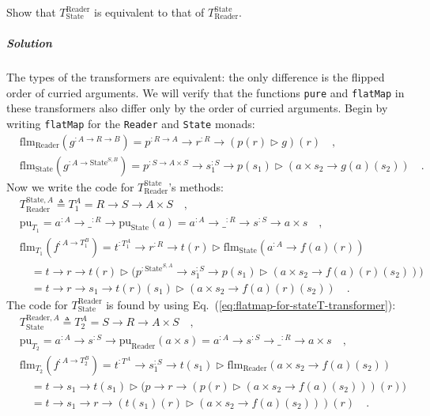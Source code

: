Show that $T_{\text{State}}^{\text{Reader}}$ is equivalent to that
of $T_{\text{Reader}}^{\text{State}}$.

\subparagraph{Solution}

The types of the transformers are equivalent: the only difference
is the flipped order of curried arguments. We will verify that the
functions \lstinline!pure! and \lstinline!flatMap! in these transformers
also differ only by the order of curried arguments. Begin by writing
\lstinline!flatMap! for the \lstinline!Reader! and \lstinline!State!
monads:
\begin{align*}
 & \text{flm}_{\text{Reader}}(g^{:A\rightarrow R\rightarrow B})=p^{:R\rightarrow A}\rightarrow r^{:R}\rightarrow(p(r)\triangleright g)(r)\quad,\\
 & \text{flm}_{\text{State}}(g^{:A\rightarrow\text{State}^{S,B}})=p^{:S\rightarrow A\times S}\rightarrow s_{1}^{:S}\rightarrow p(s_{1})\triangleright(a\times s_{2}\rightarrow g(a)(s_{2}))\quad.
\end{align*}
Now we write the code for $T_{\text{Reader}}^{\text{State}}$\textsf{'}s methods:
\begin{align*}
 & T_{\text{Reader}}^{\text{State},A}\triangleq T_{1}^{A}=R\rightarrow S\rightarrow A\times S\quad,\\
 & \text{pu}_{T_{1}}=a^{:A}\rightarrow\_^{:R}\rightarrow\text{pu}_{\text{State}}(a)=a^{:A}\rightarrow\_^{:R}\rightarrow s^{:S}\rightarrow a\times s\quad,\\
 & \text{flm}_{T_{1}}(f^{:A\rightarrow T_{1}^{B}})=t^{:T_{1}^{A}}\rightarrow r^{:R}\rightarrow t(r)\triangleright\text{flm}_{\text{State}}(a^{:A}\rightarrow f(a)(r))\\
 & \quad=t\rightarrow r\rightarrow t(r)\triangleright\big(p^{:\text{State}^{S,A}}\rightarrow s_{1}^{:S}\rightarrow p(s_{1})\triangleright(a\times s_{2}\rightarrow f(a)(r)(s_{2}))\big)\\
 & \quad=t\rightarrow r\rightarrow s_{1}\rightarrow t(r)(s_{1})\triangleright(a\times s_{2}\rightarrow f(a)(r)(s_{2}))\quad.
\end{align*}
The code for $T_{\text{State}}^{\text{Reader}}$ is found by using
Eq.~(\ref{eq:flatmap-for-stateT-transformer}):
\begin{align*}
 & T_{\text{State}}^{\text{Reader},A}\triangleq T_{2}^{A}=S\rightarrow R\rightarrow A\times S\quad,\\
 & \text{pu}_{T_{2}}=a^{:A}\rightarrow s^{:S}\rightarrow\text{pu}_{\text{Reader}}(a\times s)=a^{:A}\rightarrow s^{:S}\rightarrow\_^{:R}\rightarrow a\times s\quad,\\
 & \text{flm}_{T_{2}}(f^{:A\rightarrow T_{2}^{B}})=t^{:T^{A}}\rightarrow s_{1}^{:S}\rightarrow t(s_{1})\triangleright\text{flm}_{\text{Reader}}(a\times s_{2}\rightarrow f(a)(s_{2}))\\
 & \quad=t\rightarrow s_{1}\rightarrow t(s_{1})\triangleright\big(p\rightarrow r\rightarrow(p(r)\triangleright(a\times s_{2}\rightarrow f(a)(s_{2})))(r)\big)\\
 & \quad=t\rightarrow s_{1}\rightarrow r\rightarrow(t(s_{1})(r)\triangleright(a\times s_{2}\rightarrow f(a)(s_{2})))(r)\quad.
\end{align*}
